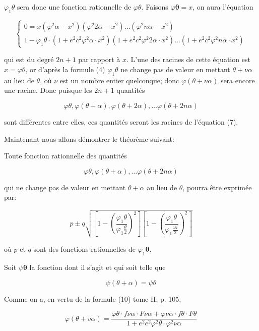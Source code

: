 \documentclass{article}
\begin{document}
\(\varphi_{1} \theta\) sera donc une fonction rationnelle de \(\varphi \theta\). Faisons \(\varphi \boldsymbol{\theta}=x\), on aura l'équation

\[
\left\{\begin{array}{c}
0=x\left(\varphi^{2} \alpha-x^{2}\right)\left(\varphi^{2} 2 \alpha-x^{2}\right) \ldots\left(\varphi^{2} n \alpha-x^{2}\right) \\
1-\varphi_{1} \theta \cdot\left(1+e^{2} c^{2} \varphi^{2} \alpha \cdot x^{2}\right)\left(1+e^{2} c^{2} \varphi^{2} 2 \alpha \cdot x^{2}\right) \ldots\left(1+e^{2} c^{2} \varphi^{2} n \alpha \cdot x^{2}\right)
\end{array}\right.
\]

qui est du degré \(2 n+1\) par rapport à \(x\). L'une des racines de cette équation est \(x=\varphi \theta\), or d'après la formule (4) \(\varphi_{1} \theta\) ne change pas de valeur en mettant \(\theta+\nu \alpha\) au lieu de \(\theta\), où \(\nu\) est un nombre entier quelconque; donc \(\varphi(\theta+\nu \alpha)\) sera encore une racine. Donc puisque les \(2 n+1\) quantités

\[
\varphi \theta, \varphi(\theta+\alpha), \varphi(\theta+2 \alpha), \ldots \varphi(\theta+2 n \alpha)
\]

sont différentes entre elles, ces quantités seront les racines de l'équation (7).

Maintenant nous allons démontrer le théorème suivant:

Toute fonction rationnelle des quantités

\[
\varphi \theta, \varphi(\theta+\alpha), \ldots \varphi(\theta+2 n \alpha)
\]

qui ne change pas de valeur en mettant \(\theta+\alpha\) au lieu de \(\theta\), pourra être exprimée par:

\[
p \pm q \sqrt{\left[1-\left(\frac{\varphi_{1} \theta}{\varphi_{1} \frac{\theta}{2}}\right)^{2}\right]\left[1-\left(\frac{\varphi_{1} \theta}{\varphi_{1} \frac{\omega i}{2}}\right)^{2}\right]}
\]

où \(p\) et \(q\) sont des fonctions rationnelles de \(\varphi_{1} \boldsymbol{\theta}\).

Soit \(\psi \boldsymbol{\theta}\) la fonction dont il s'agit et qui soit telle que

\[
\psi(\theta+\alpha)=\psi \theta
\]

Comme on a, en vertu de la formule (10) tome II, p. 105,

\[
\varphi(\theta+v \alpha)=\frac{\varphi \theta \cdot f \nu \alpha \cdot F \nu \alpha+\varphi \nu \alpha \cdot f \theta \cdot F \theta}{1+e^{2} e^{2} \varphi^{2} \theta \cdot \varphi^{2} \nu \alpha}
\]
\end{document}
